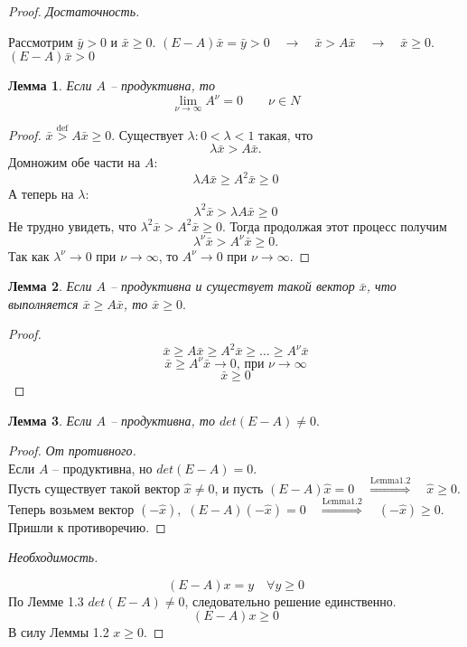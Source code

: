 \documentclass[12pt,a4paper,titlepage,oneside]{book}
\theoremstyle{definition}
\theoremstyle{plain}
\theoremstyle{remark}
\theoremstyle{remark}
\theoremstyle{plain}
\newtheorem{lemma}{Лемма}[chapter]
\theoremstyle{plain}
\begin{document}
\begin{proof}
\textit{Достаточность.}

Рассмотрим $\bar{y} > 0$ и $\bar{x} \geq 0$. $(E-A)\bar{x} = \bar{y} > 0 \quad \rightarrow \quad \bar{x} > A\bar{x} \quad \rightarrow \quad \bar{x} \geq 0$. $(E-A)\bar{x} > 0$ 
\begin{lemma}\label{l1.1}
Если $A$ -- продуктивна, то
$$\lim_{\nu \to \infty} A^{\nu} = 0 \qquad \nu \in N$$

\end{lemma}
\begin{proof}
$ \bar{x} \overset{\mathrm{def}}{>} A \bar{x} \geq 0$. Существует $\lambda : 0 < \lambda < 1$ такая, что $$\lambda \bar{x} > A\bar{x}.$$ 
Домножим обе части на $A$:
$$\lambda A \bar{x} \geq A^2 \bar{x} \geq 0$$
А теперь на $\lambda$:
$$ \lambda^2 \bar{x} > \lambda A \bar{x} \geq 0$$
Не трудно увидеть, что $\lambda^2 \bar{x} > A^2 \bar{x} \geq 0$. Тогда продолжая этот процесс получим 
$$\lambda^{\nu} \bar{x} > A^{\nu} \bar{x} \geq 0.$$
Так как $\lambda^{\nu} \to 0$ при $ \nu \to \infty$, то $A^{\nu} \to 0 $ при $ \nu \to \infty.$
\end{proof}

\begin{lemma}\label{l1.2}
Если $A$ -- продуктивна и существует такой вектор $\bar{x}$, что выполняется $\bar{x} \geq A\bar{x}$, то $\bar{x} \geq 0.$
\end{lemma}
\begin{proof}

$$\bar{x} \geq A\bar{x} \geq A^2\bar{x} \geq \dots \geq A^{\nu} \bar{x}$$
$$\bar{x} \geq A^{\nu} \bar{x} \to 0 \text{, при } \nu \to \infty$$
$$\bar{x} \geq 0$$
\end{proof}

\begin{lemma}\label{l1.3}
Если $A$ -- продуктивна, то $det(E-A) \neq 0.$
\end{lemma}
\begin{proof}
\textit{От противного.}\\
Если $A$ -- продуктивна, но $det(E-A) = 0.$\\
Пусть существует такой вектор $\hat{x} \neq 0$, и пусть $(E-A)\hat{x} = 0 \quad \overset{\mathrm{Lemma 1.2}}{\Longrightarrow} \quad \hat{x} \geq 0$.\\
Теперь возьмем вектор $(-\hat{x}),$ $(E-A)(-\hat{x}) = 0 \quad \overset{\mathrm{Lemma 1.2}}{\Longrightarrow} \quad (-\hat{x}) \geq 0.$
Пришли к противоречию.
\end{proof}

\textit{Необходимость.}

$$(E-A)x=y \quad \forall y \geq 0$$
По Лемме 1.3 $det(E-A) \neq 0$, следовательно решение единственно.
$$(E-A)x \geq 0$$
В силу Леммы 1.2 $x \geq 0.$
\end{proof}
\end{document}
